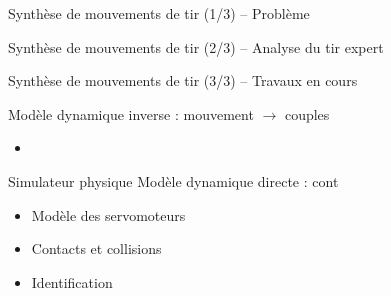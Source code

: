 
\begin{frame}{Synthèse de mouvements de tir (1/3) -- Problème}
\end{frame}

\begin{frame}{Synthèse de mouvements de tir (2/3) -- Analyse du tir expert}
\end{frame}

\begin{frame}{Synthèse de mouvements de tir (3/3) -- Travaux en cours}
    \begin{block}{}
        Modèle dynamique inverse : mouvement $\rightarrow$ couples
    \end{block}
    \begin{itemize}
        \item
    \end{itemize}
    \begin{block}{Simulateur physique}
        Modèle dynamique directe : cont
        \begin{itemize}
            \item Modèle des servomoteurs
            \item Contacts et collisions
        \end{itemize}
    \end{block}
    \begin{itemize}
        \item Identification
    \end{itemize}
\end{frame}

